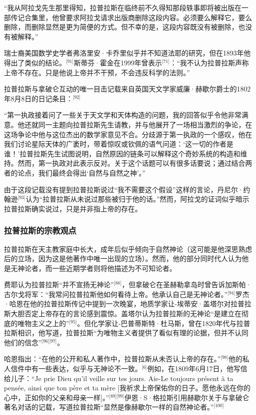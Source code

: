 “我从阿拉戈先生那里得知，拉普拉斯在临终前不久得知那段轶事即将被出版在一部传记合集里，他曾要求阿拉戈请求出版商删除这段内容。必须要么解释它，要么删除，而删除显然是更为简便的方式。但不幸的是，这段内容既没有被删除，也没有被解释。”

瑞士裔美国数学史学者弗洛里安·卡乔里似乎并不知道法耶的研究，但在1893年他得出了类似的结论。\(^\text{[91]}\)斯蒂芬·霍金在1999年曾表示\(^\text{[71]}\)：“我不认为拉普拉斯声称上帝不存在。只是他说上帝并不干预，不会违反科学的法则。”

拉普拉斯与拿破仑互动的唯一目击记载来自英国天文学家威廉·赫歇尔爵士的1802年8月8日的日记条目：\(^\text{[92]}\)

“第一执政接着问了一些关于天文学和天体构造的问题，我的回答似乎令他非常满意。他还就同一主题向拉普拉斯先生请教，并与他展开了一场相当激烈的争论，在这场争论中他与这位杰出的数学家意见不合。分歧源于第一执政的一个感叹，他在我们讨论星际天体的广袤时，带着惊叹或钦佩的语气问道：‘这一切的作者是谁！’拉普拉斯先生试图说明，自然原因的链条可以解释这个奇妙系统的构造和维持。然而，第一执政对此表示反对。关于这个话题可以有很多话要说；通过结合两者的论点，我们最终会得出‘自然与自然之神’。”

由于这段记载没有提到拉普拉斯说过“我不需要这个假设”这样的言论，丹尼尔·约翰逊\(^\text{[93]}\)认为“拉普拉斯从未说过那些被归于他的话。”然而，阿拉戈的证词似乎暗示拉普拉斯确实说过，只是并非指上帝的存在。
\subsubsection{拉普拉斯的宗教观点}
拉普拉斯在天主教家庭中长大，成年后似乎倾向于自然神论（这可能是他深思熟虑后的立场，因为这是他著作中唯一出现的立场）。然而，他的部分同时代人认为他是无神论者，而一些近期学者则将他描述为不可知论者。

费耶认为拉普拉斯“并不宣扬无神论”\(^\text{[88]}\)，但拿破仑在圣赫勒拿岛时曾告诉加斯帕·古尔戈将军：“我常问拉普拉斯他如何看待上帝。他承认自己是无神论者。”\(^\text{[94]}\)罗杰·哈恩在他的拉普拉斯传记中提到一次晚宴，地质学家让-埃蒂安·盖塔尔对拉普拉斯大胆否定上帝存在的言论感到震惊。盖塔尔认为拉普拉斯的无神论“是建立在彻底的唯物主义之上的”\(^\text{[95]}\)。但化学家让-巴普蒂斯特·杜马斯，曾在1820年代与拉普拉斯相识，他写道，拉普拉斯“为唯物主义者提供了看似有理的论据，但并不认同他们的信念”\(^\text{[96][97]}\)。

哈恩指出：“在他的公开和私人著作中，拉普拉斯从未否认上帝的存在。”\(^\text{[98]}\)他的私人信件中有一些表达，似乎与无神论不一致。\(^\text{[6]}\)例如，在1809年6月17日，他写信给儿子：“Je prie Dieu qu'il veille sur tes jours. Aie-Le toujours présent à ta pensée, ainsi que ton père et ta mère [我祈求上帝保佑你的日子。愿他永远在你的心中，正如你的父亲和母亲一样]。”\(^\text{[89][99]}\)伊恩·S·格拉斯引用赫歇尔关于与拿破仑著名对话的记载，写道拉普拉斯“显然是像赫歇尔一样的自然神论者。”\(^\text{[100]}\)

